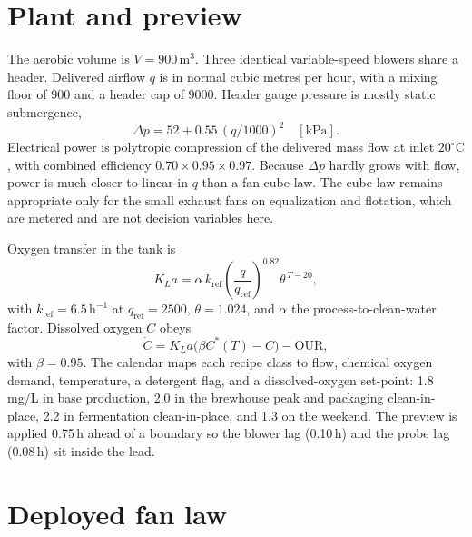 \documentclass[11pt,a4paper]{article}
\begin{document}
\section{Plant and preview}

The aerobic volume is \(V=900\,\mathrm{m^3}\). Three identical variable-speed blowers share a header. Delivered airflow \(q\) is in normal cubic metres per hour, with a mixing floor of 900 and a header cap of 9000. Header gauge pressure is mostly static submergence,
\begin{equation}
\label{eq:dp}
\Delta p = 52 + 0.55\,(q/1000)^{2}
\quad[\mathrm{kPa}].
\end{equation}
Electrical power is polytropic compression of the delivered mass flow at inlet \(20^{\circ}\mathrm{C}\), with combined efficiency \(0.70\times 0.95\times 0.97\). Because \(\Delta p\) hardly grows with flow, power is much closer to linear in \(q\) than a fan cube law. The cube law remains appropriate only for the small exhaust fans on equalization and flotation, which are metered and are not decision variables here.

Oxygen transfer in the tank is
\begin{equation}
\label{eq:kla}
K_La = \alpha\,k_{\mathrm{ref}}\left(\frac{q}{q_{\mathrm{ref}}}\right)^{0.82}\theta^{\,T-20},
\end{equation}
with \(k_{\mathrm{ref}}=6.5\,\mathrm{h^{-1}}\) at \(q_{\mathrm{ref}}=2500\), \(\theta=1.024\), and \(\alpha\) the process-to-clean-water factor. Dissolved oxygen \(C\) obeys
\begin{equation}
\label{eq:do}
\dot C = K_La\big(\beta C^{*}(T)-C\big) - \mathrm{OUR},
\end{equation}
with \(\beta=0.95\). The calendar maps each recipe class to flow, chemical oxygen demand, temperature, a detergent flag, and a dissolved-oxygen set-point: 1.8\,mg/L in base production, 2.0 in the brewhouse peak and packaging clean-in-place, 2.2 in fermentation clean-in-place, and 1.3 on the weekend. The preview is applied 0.75\,h ahead of a boundary so the blower lag (0.10\,h) and the probe lag (0.08\,h) sit inside the lead.

\section{Deployed fan law}
\end{document}
